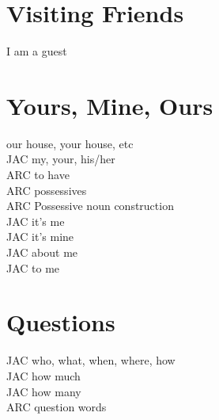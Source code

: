 \chapter{Visiting Friends}
I am a guest\\
\chapter{Yours, Mine, Ours}
our house, your house, etc\\
JAC my, your, his/her\\
ARC to have\\
ARC possessives\\
ARC Possessive noun construction\\
JAC it's me\\
JAC it's mine\\
JAC about me\\
JAC to me\\
\chapter{Questions}
JAC who, what, when, where, how\\
JAC how much\\
JAC how many\\
ARC question words\\
